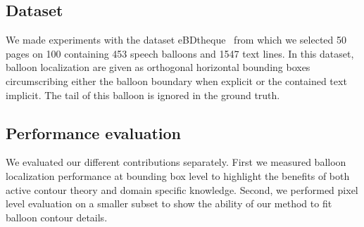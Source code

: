 \documentclass[conference]{IEEEtran}
\begin{document}

\subsection{Dataset}
\label{sec:dataset}
We made experiments with the dataset eBDtheque~\cite{Guerin2013} from which we selected 50 pages on 100 containing 453 speech balloons and 1547 text lines. In this dataset, balloon localization are given as orthogonal horizontal bounding boxes circumscribing either the balloon boundary when explicit or the contained text implicit. The tail of this balloon is ignored in the ground truth.



\subsection{Performance evaluation}
\label{sec:eval}

We evaluated our different contributions separately. First we measured balloon localization performance at bounding box level to highlight the benefits of both active contour theory and domain specific knowledge. Second, we performed pixel level evaluation on a smaller subset to show the ability of our method to fit balloon contour details.
\end{document}
